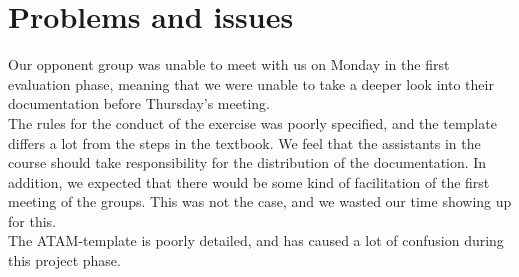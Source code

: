 \section{Problems and issues}

Our opponent group was unable to meet with us on Monday in the first evaluation phase, meaning that we were unable to take a deeper look into their documentation before Thursday’s meeting. \\

The rules for the conduct of the exercise was poorly specified, and the template differs a lot from the steps in the textbook. We feel that the assistants in the course should take responsibility for the distribution of the documentation. In addition, we expected that there would be some kind of facilitation of the first meeting of the groups. This was not the case, and we wasted our time showing up for this. \\

The ATAM-template is poorly detailed, and has caused a lot of confusion during this project phase.




